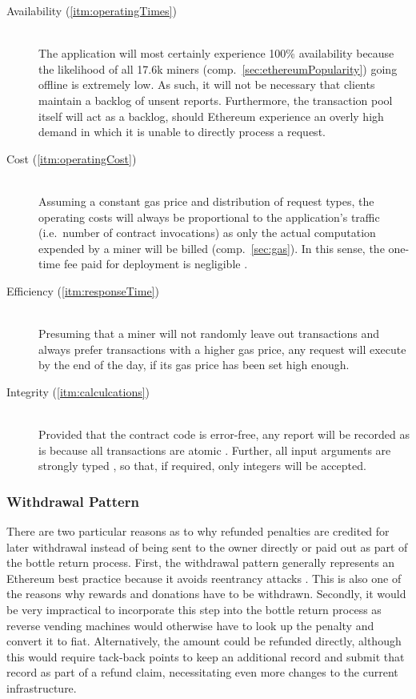 \begin{description}
	\item[Availability (\ref{itm:operatingTimes})]
	\hfill \\
	The application will most certainly experience 100\% availability because the likelihood of all 17.6k miners (comp.~\ref{sec:ethereumPopularity}) going offline is extremely low. As such, it will not be necessary that clients maintain a backlog of unsent reports. Furthermore, the transaction pool itself will act as a backlog, should Ethereum experience an overly high demand in which it is unable to directly process a request.
	\item[Cost (\ref{itm:operatingCost})]
	\hfill \\
	Assuming a constant gas price and distribution of request types, the operating costs will always be proportional to the application's traffic (i.e.~number of contract invocations) as only the actual computation expended by a miner will be billed (comp.~\ref{sec:gas}). In this sense, the one-time fee paid for deployment is negligible \cite{}.
	\item[Efficiency (\ref{itm:responseTime})]
	\hfill \\
	Presuming that a miner will not randomly leave out transactions and always prefer transactions with a higher gas price, any request will execute by the end of the day, if its gas price has been set high enough. 
	\item[Integrity (\ref{itm:calculcations})]
	\hfill \\
	Provided that the contract code is error-free, any report will be recorded as is because all transactions are atomic \cite{}. Further, all input arguments are strongly typed \cite{}, so that, if required, only integers will be accepted.
\end{description}

\subsubsection{Withdrawal Pattern}
There are two particular reasons as to why refunded penalties are credited for later withdrawal instead of being sent to the owner directly or paid out as part of the bottle return process. First, the withdrawal pattern generally represents an Ethereum best practice because it avoids reentrancy attacks \cite{}. This is also one of the reasons why rewards and donations have to be withdrawn. Secondly, it would be very impractical to incorporate this step into the bottle return process as reverse vending machines would otherwise have to look up the penalty and convert it to fiat. Alternatively, the amount could be refunded directly, although this would require tack-back points to keep an additional record and submit that record as part of a refund claim, necessitating even more changes to the current infrastructure.

